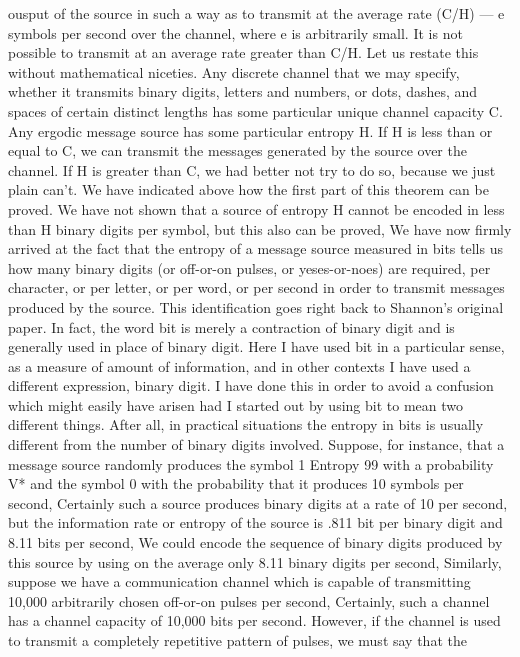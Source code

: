 {{{ousput of the source in such a way as to transmit at the average rate
(C/H) — e symbols per second over the channel, where e is arbitrarily
small. It is not possible to transmit at an average rate greater than C/H.
Let us restate this without mathematical niceties. Any discrete
channel that we may specify, whether it transmits binary digits,
letters and numbers, or dots, dashes, and spaces of certain distinct
lengths has some particular unique channel capacity C. Any
ergodic message source has some particular entropy H. If H is less
than or equal to C, we can transmit the messages generated by the
source over the channel. If H is greater than C, we had better not
try to do so, because we just plain can’t.
We have indicated above how the first part of this theorem can
be proved. We have not shown that a source of entropy H cannot
be encoded in less than H binary digits per symbol, but this also
can be proved,
We have now firmly arrived at the fact that the entropy of a
message source measured in bits tells us how many binary digits
(or off-or-on pulses, or yeses-or-noes) are required, per character,
or per letter, or per word, or per second in order to transmit
messages produced by the source. This identification goes right
back to Shannon’s original paper. In fact, the word bit is merely
a contraction of binary digit and is generally used in place of
binary digit.
Here I have used bit in a particular sense, as a measure of
amount of information, and in other contexts I have used a different
expression, binary digit. I have done this in order to avoid a
confusion which might easily have arisen had I started out by using
bit to mean two different things.
After all, in practical situations the entropy in bits is usually
different from the number of binary digits involved. Suppose, for
instance, that a message source randomly produces the symbol 1
Entropy 99
with a probability V* and the symbol 0 with the probability %
that it produces 10 symbols per second, Certainly such a source
produces binary digits at a rate of 10 per second, but the information
rate or entropy of the source is .811 bit per binary digit and
8.11 bits per second, We could encode the sequence of binary digits
produced by this source by using on the average only 8.11 binary
digits per second,
Similarly, suppose we have a communication channel which is
capable of transmitting 10,000 arbitrarily chosen off-or-on pulses
per second, Certainly, such a channel has a channel capacity of
10,000 bits per second. However, if the channel is used to transmit
a completely repetitive pattern of pulses, we must say that the
}}}
